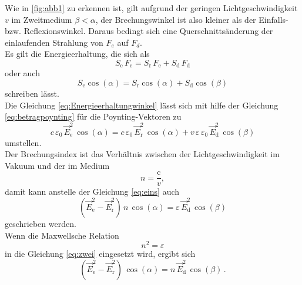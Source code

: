 Wie in \autoref{fig:abb1} zu erkennen ist, gilt aufgrund der geringen Lichtgeschwindigkeit $v$ im Zweitmedium $\beta < \alpha$, der Brechungswinkel ist also kleiner als der Einfalls- bzw. Reflexionswinkel.
Daraus bedingt sich eine Querschnittsänderung der einlaufenden Strahlung von $F_e$ auf $F_d$. \\

Es gilt die Energieerhaltung, die sich als
\begin{equation*}
    S_{\text{e}} \, F_{\text{e}} = S_{\text{r}} \, F_{\text{e}} +  S_{\text{d}} \, F_{\text{d}}
    \label{eq:Energieerhaltung}
\end{equation*}
oder auch 
\begin{equation}
    S_{\text{e}} \cos(\alpha) = S_{\text{r}} \cos(\alpha) +  S_{\text{d}} \cos(\beta)
    \label{eq:Energieerhaltungwinkel}
\end{equation}
schreiben lässt. \\

Die Gleichung \eqref{eq:Energieerhaltungwinkel} lässt sich mit hilfe der Gleichung \eqref{eq:betragpoynting} für die Poynting-Vektoren zu 
\begin{equation}
    c \, \varepsilon_0 \, \vec{E}^2_{\text{e}} \, \cos(\alpha) = c \, \varepsilon_0 \, \vec{E}^2_{\text{r}} \, \cos(\alpha) + v \, \varepsilon \, \varepsilon_0 \, \vec{E}^2_{\text{d}} \, \cos(\beta)
    \label{eq:eins}
\end{equation}
umstellen.\\

Der Brechungsindex ist das Verhältnis zwischen der Lichtgeschwindigkeit im Vakuum und der im Medium 
\begin{equation*}
    n = \dfrac{\text{c}}{v} ,
    \label{eq:Brechungsindex}
\end{equation*}
damit kann anstelle der Gleichung \eqref{eq:eins} auch
\begin{equation}
    (\vec{E}^2_{\text{e}}  - \vec{E}^2_{\text{r}}) \, n \, \cos(\alpha) = \varepsilon \, \vec{E}^2_{\text{d}} \, \cos(\beta)
    \label{eq:zwei}
\end{equation}
geschrieben werden. \\

Wenn die Maxwellsche Relation
\begin{equation*}
    n^2 = \varepsilon
    \label{eq:Maxwellschrelation}
\end{equation*}
in die Gleichung \eqref{eq:zwei} eingesetzt wird, ergibt sich 
\begin{equation}
    (\vec{E}^2_{\text{e}}  - \vec{E}^2_{\text{r}}) \, \cos(\alpha) = n \, \vec{E}^2_{\text{d}} \, \cos(\beta) \,.
    \label{eq:drei}
\end{equation}

